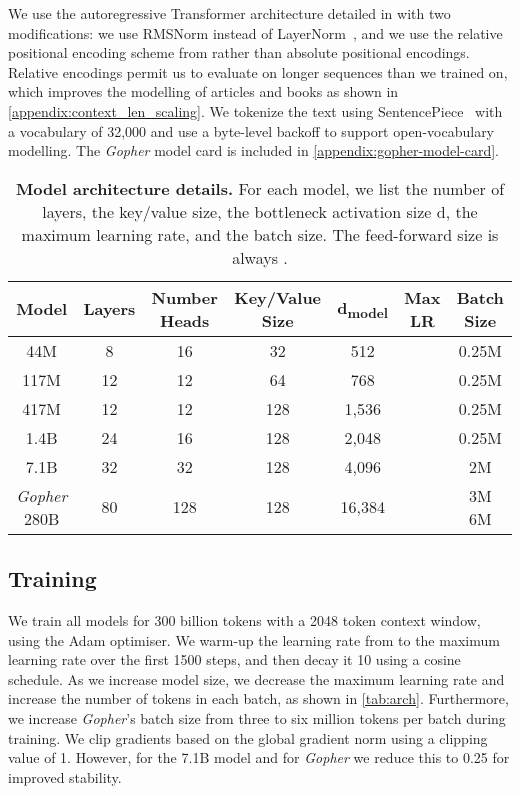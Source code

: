 \documentclass[11pt, a4paper, logo, internal, copyright, nonumbering]{deepmind}
\newcommand{\gopher}{\textit{Gopher}\xspace}
\begin{document}
We use the autoregressive Transformer architecture detailed in \citet{radford2019language} with two modifications: we use RMSNorm \citep{zhang2019root} instead of LayerNorm~\citep{ba2016layer}, 
and we use the relative positional encoding scheme from \citet{dai2019transformer} rather than absolute positional encodings.
Relative encodings permit us to evaluate on longer sequences than we trained on, which improves the modelling of articles and books as shown in \autoref{appendix:context_len_scaling}.
We tokenize the text using SentencePiece~\citep{kudo2018sentencepiece} with a vocabulary of 32,000 and use a byte-level backoff to support open-vocabulary modelling. 
The \gopher model card \citep{mitchell2019model} is included in \autoref{appendix:gopher-model-card}.

\begin{table*}[t]
    \centering
    \begin{tabular}{ccccccc}
    \toprule
        \textbf{Model} & \textbf{Layers} & \textbf{Number Heads} & \textbf{Key/Value Size} & \textbf{d\textsubscript{model}} & \textbf{Max LR}  & \textbf{Batch Size} \\ 
        \midrule
         44M & 8 & 16 & 32 & 512 &   &  0.25M \\
         117M & 12 &  12 & 64 & 768 &  &  0.25M \\
         417M & 12 & 12 & 128 & 1,536 &  &  0.25M \\ 
         1.4B & 24 & 16 & 128 & 2,048 &  & 0.25M \\
         7.1B & 32 & 32 & 128 & 4,096 &  & 2M \\
         \gopher 280B & 80 & 128 & 128 & 16,384 &  & 3M  6M\\ 
         \bottomrule
    \end{tabular}
    \caption{\textbf{Model architecture details.} For each model, we list the number of layers, the key/value size, the bottleneck activation size d, the maximum learning rate, and the batch size. The feed-forward size is always .}
    \label{tab:arch}
\end{table*}

\subsection{Training}
\label{method:training}
We train all models for 300 billion tokens with a 2048 token context window, using the Adam \citep{kingma2014adam} optimiser.
We warm-up the learning rate from  to the maximum learning rate over the first 1500 steps, and then decay it 10 using a cosine schedule.
As we increase model size, we decrease the maximum learning rate and increase the number of tokens in each batch, as shown in \autoref{tab:arch}.
Furthermore, we increase \gopher's batch size from three to six million tokens per batch during training.
We clip gradients based on the global gradient norm using a clipping value of 1.
However, for the 7.1B model and for \gopher we reduce this to 0.25 for improved stability.
\end{document}
